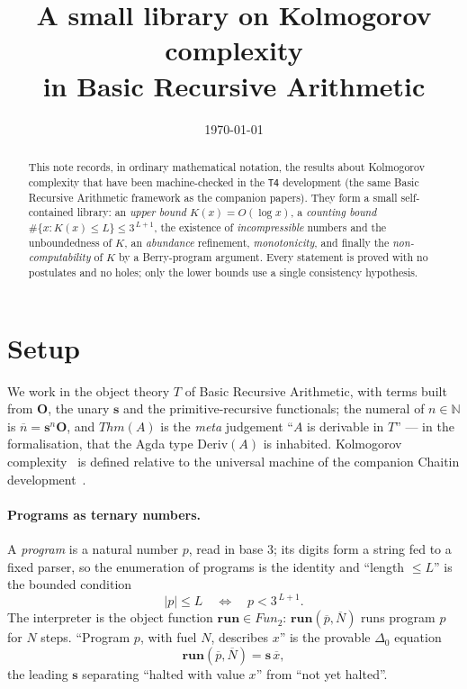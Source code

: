 \documentclass[11pt]{article}
\title{A small library on Kolmogorov complexity\\ in Basic Recursive Arithmetic}
\author{}
\date{\today}
\theoremstyle{plain}
\theoremstyle{definition}
\theoremstyle{remark}
\newcommand{\run}{\mathbf{run}}
\newcommand{\Fun}{\mathit{Fun}}
\newcommand{\Thm}[1]{\mathit{Thm}(#1)}
\newcommand{\Kc}{K}
\begin{document}
\maketitle

\begin{abstract}
  This note records, in ordinary mathematical notation, the results about
  Kolmogorov complexity that have been machine-checked in the \texttt{T4}
  development (the same Basic Recursive Arithmetic framework as the
  companion papers). They form a small self-contained library: an
  \emph{upper bound} $\Kc(x)=O(\log x)$, a \emph{counting bound}
  $\#\{x:\Kc(x)\le L\}\le 3^{\,L+1}$, the existence of \emph{incompressible}
  numbers and the unboundedness of $\Kc$, an \emph{abundance} refinement,
  \emph{monotonicity}, and finally the \emph{non-computability} of $\Kc$
  by a Berry-program argument. Every statement is proved with no
  postulates and no holes; only the lower bounds use a single consistency
  hypothesis.
\end{abstract}

\section{Setup}

We work in the object theory $T$ of Basic Recursive Arithmetic, with
terms built from $\mathbf{O}$, the unary $\mathbf{s}$ and the
primitive-recursive functionals; the numeral of $n\in\mathbb N$ is
$\overline n=\mathbf{s}^n\mathbf{O}$, and $\Thm{A}$ is the \emph{meta}
judgement ``$A$ is derivable in $T$'' --- in the formalisation, that the
Agda type $\mathrm{Deriv}(A)$ is inhabited. Kolmogorov
complexity~\cite{Kolmogorov65,LiVitanyi} is defined relative to the
universal machine of the companion Chaitin development~\cite{arGII}.

\paragraph{Programs as ternary numbers.}
A \emph{program} is a natural number $p$, read in base $3$; its digits
form a string fed to a fixed parser, so the enumeration of programs is the
identity and ``length $\le L$'' is the bounded condition
\[
   |p|\le L \quad\Longleftrightarrow\quad p < 3^{\,L+1}.
\]
The interpreter is the object function $\run\in\Fun_2$: $\run(\overline
p,\overline N)$ runs program $p$ for $N$ steps. ``Program $p$, with fuel
$N$, describes $x$'' is the provable $\Delta_0$ equation
\[
   \run(\overline p,\overline N)=\mathbf{s}\,\overline x,
\]
the leading $\mathbf{s}$ separating ``halted with value $x$'' from ``not
yet halted''.
\end{document}
